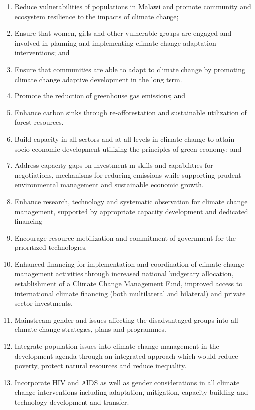 \documentclass[
]{book}
\providecommand{\tightlist}{%
  \setlength{\itemsep}{0pt}\setlength{\parskip}{0pt}}
\begin{document}
\begin{enumerate}
\def\labelenumi{\arabic{enumi}.}
\tightlist
\item
  Reduce vulnerabilities of populations in Malawi and promote community and ecosystem resilience to the impacts of climate change;\\
\item
  Ensure that women, girls and other vulnerable groups are engaged and involved in planning and implementing climate change adaptation interventions; and\\
\item
  Ensure that communities are able to adapt to climate change by promoting climate change adaptive development in the long term.\\
\item
  Promote the reduction of greenhouse gas emissions; and\\
\item
  Enhance carbon sinks through re-afforestation and sustainable utilization of forest resources.\\
\item
  Build capacity in all sectors and at all levels in climate change to attain socio-economic development utilizing the principles of green economy; and\\
\item
  Address capacity gaps on investment in skills and capabilities for negotiations, mechanisms for reducing emissions while supporting prudent environmental management and sustainable economic growth.\\
\item
  Enhance research, technology and systematic observation for climate change management, supported by appropriate capacity development and dedicated financing\\
\item
  Encourage resource mobilization and commitment of government for the prioritized technologies.\\
\item
  Enhanced financing for implementation and coordination of climate change management activities through increased national budgetary allocation, establishment of a Climate Change Management Fund, improved access to international climate financing (both multilateral and bilateral) and private sector investments.\\
\item
  Mainstream gender and issues affecting the disadvantaged groups into all climate change strategies, plans and programmes.\\
\item
  Integrate population issues into climate change management in the development agenda through an integrated approach which would reduce poverty, protect natural resources and reduce inequality.\\
\item
  Incorporate HIV and AIDS as well as gender considerations in all climate change interventions including adaptation, mitigation, capacity building and technology development and transfer.
\end{enumerate}
\end{document}
